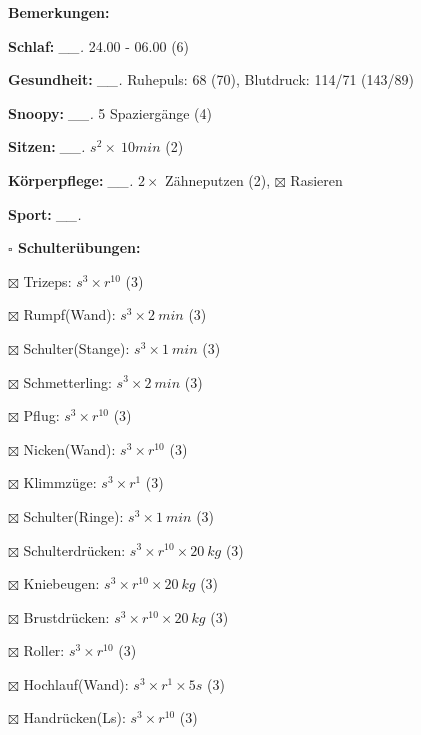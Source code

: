 \documentclass[10pt,a4paper]{article}
\newcommand\prop[1] {{\color {alizarin} {\bf #1}}}             %
\newcommand\mand[1] {{\color {burntorange} {\bf #1}}}          %
\newcommand\topspace{\vskip -15pt \hskip 20pt}
\newcommand\n[1] { {\sl #1.} \hskip 5pt }
\begin{document}
\begin{mdframed}[style=daystyle]
  \begin{labeling}{{\mand {Bemerkungen:}}}
    \setlength\itemsep{-3pt}
  \item[{\mand {Schlaf:}}]        \n{\_\_} 24.00 - 06.00 (6)
  \item[{\mand {Gesundheit:}}]    \n{\_\_} Ruhepuls: 68 (70), Blutdruck: 114/71 (143/89)
  \item[{\mand {Snoopy:}}]        \n{\_\_} 5 Spaziergänge (4)
  \item[{\mand {Sitzen:}}]        \n{\_\_} $s^2 \times\ 10 min$ (2)
  \item[{\mand {Körperpflege:}}]  \n{\_\_} $2 \times$ Zähneputzen (2), $\boxtimes$ Rasieren
  \item[{\mand {Sport:}}]         \n{\_\_}
    \topspace
    \begin{minipage}{0.75\textwidth}  
      \begin{labeling}{\prop {$\square$ {Schulterübungen:}}} 
        \setlength\itemsep{-3pt}
      \item[$\boxtimes$ Trizeps:]          $s^3 \times r^{10}$ (3)
      \item[$\boxtimes$ Rumpf(Wand):]      $s^3 \times 2\ min$ (3)
      \item[$\boxtimes$ Schulter(Stange):] $s^3 \times 1\ min$ (3)
      \item[$\boxtimes$ Schmetterling:]    $s^3 \times 2\ min$ (3)
      \item[$\boxtimes$ Pflug:]            $s^3 \times r^{10}$ (3)
      \item[$\boxtimes$ Nicken(Wand):]     $s^3 \times r^{10}$ (3)
      \item[$\boxtimes$ Klimmzüge:]        $s^3 \times r^1$ (3)
      \item[$\boxtimes$ Schulter(Ringe):]  $s^3 \times 1\ min$ (3)
      \item[$\boxtimes$ Schulterdrücken:]  $s^3 \times r^{10} \times 20\ kg$ (3)
      \item[$\boxtimes$ Kniebeugen:]       $s^3 \times r^{10} \times 20\ kg$ (3)
      \item[$\boxtimes$ Brustdrücken:]     $s^3 \times r^{10} \times 20\ kg$ (3)
      \item[$\boxtimes$ Roller:]           $s^3 \times r^{10}$ (3)
      \item[$\boxtimes$ Hochlauf(Wand):]   $s^3 \times r^{1} \times 5s$ (3)
      \item[$\boxtimes$ Handrücken(Ls):]   $s^3 \times r^{10}$ (3)

\end{labeling}
\end{minipage}
\end{labeling}
\end{mdframed}
\end{document}
